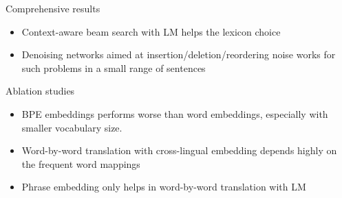 \documentclass[11pt, a4paper, landscape]{article}
\begin{document}
	\NewPage
	\vfill
	Comprehensive results
	\begin{itemize}
		\item Context-aware beam search with LM helps the lexicon choice
		\item Denoising networks aimed at insertion/deletion/reordering noise works for such problems in a small range of sentences\\
	\end{itemize}
	Ablation studies
	\begin{itemize}
		\item BPE embeddings performs worse than word embeddings, especially with smaller
		vocabulary size.
		\item Word-by-word translation with cross-lingual
embedding depends highly on the frequent word mappings
		\item Phrase embedding only helps in word-by-word translation with LM
	\end{itemize}
	\vfill


	
	

	\FinalPage
	

	
	
	\NewPage
	
	
	
\end{document}
